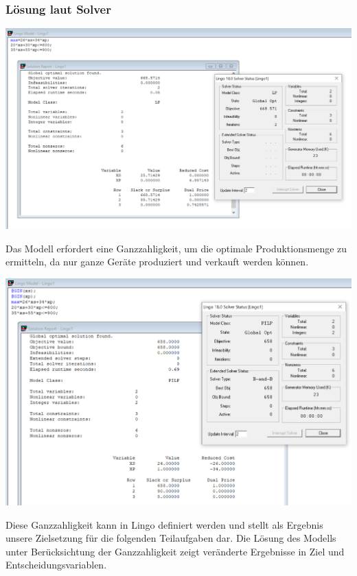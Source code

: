 \documentclass[a4paper,11pt]{article}
\begin{document}
\subsubsection*{Lösung laut Solver}
\begin{centering}
	\includegraphics[width=1\linewidth]{src/blatt_5_aufgabe_2_teilaufgabe_a_loesung_solver_decimal.png}
\end{centering}
Das Modell erfordert eine Ganzzahligkeit, um die optimale Produktionsmenge zu ermitteln, da nur ganze Geräte produziert und verkauft werden können. 
\begin{centering}
	\includegraphics[width=1\linewidth]{src/blatt_5_aufgabe_2_teilaufgabe_a_loesung_solver_integer.png}
\end{centering}
Diese Ganzzahligkeit kann in Lingo definiert werden und stellt als Ergebnis unsere Zielsetzung für die folgenden Teilaufgaben dar. Die Lösung des Modells unter Berücksichtung der Ganzzahligkeit zeigt veränderte Ergebnisse in Ziel und Entscheidungsvariablen.
\pagebreak
\end{document}
